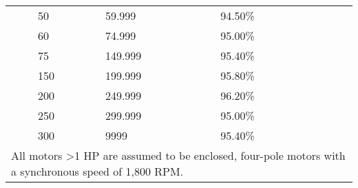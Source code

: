 \begin{table}[]
\begin{tabular}{|p{1.4cm}|p{1.5cm}|p{1.5cm}|p{1.5cm}|p{2cm}|}
 & 50      & 59.999  & 94.50\% &                                           \\ \cline{2-4}
 & 60      & 74.999  & 95.00\% &                                           \\ \cline{2-4}
 & 75      & 149.999 & 95.40\% &                                           \\ \cline{2-4}
 & 150     & 199.999 & 95.80\% &                                           \\ \cline{2-4}
 & 200     & 249.999 & 96.20\% &                                           \\ \cline{2-4}
 & 250     & 299.999 & 95.00\% &                                           \\ \cline{2-4}
 & 300     & 9999    & 95.40\% &                                           \\ \hline
 \multicolumn{5}{l}{All motors >1 HP are assumed to be enclosed, four-pole motors with a synchronous speed of 1,800 RPM.}
\end{tabular}
\end{table}